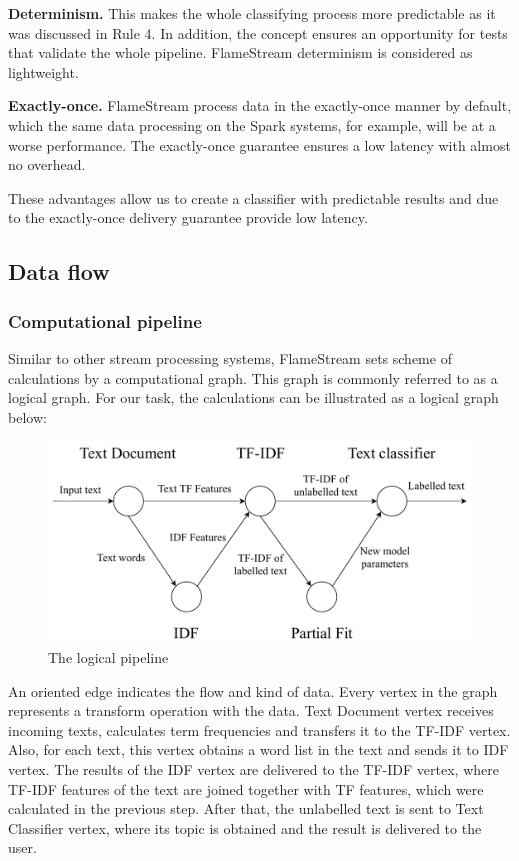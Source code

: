 \textbf{Determinism.} This makes the whole classifying process more predictable as it was discussed in \cite{stonebraker20058} Rule 4. In addition, the concept ensures an opportunity for tests that validate the whole pipeline. FlameStream determinism is considered as lightweight.

\textbf{Exactly-once.} FlameStream process data in the exactly-once manner by default, which the same data processing on the Spark systems, for example, will be at a worse performance. The exactly-once guarantee ensures a low latency with almost no overhead.

These advantages allow us to create a classifier with predictable results and due to the exactly-once delivery guarantee provide low latency.

\subsection{Data flow \label{DF}}

\subsubsection{Computational pipeline}

Similar to other stream processing systems, FlameStream sets scheme of calculations by a computational graph. This graph is commonly referred to as a logical graph. For our task, the calculations can be illustrated as a logical graph below:

\begin{figure}[htbp]
  \centering
  \includegraphics[scale=0.48]{pics/logical-graph}
  \caption{The logical pipeline}
  \label {logical graph}
\end{figure}

An oriented edge indicates the flow and kind of data. Every vertex in the graph represents a transform operation with the data. Text Document vertex receives incoming texts, calculates term frequencies and transfers it to the TF-IDF vertex. Also, for each text, this vertex obtains a word list in the text and sends it to IDF vertex. The results of the IDF vertex are delivered to the TF-IDF vertex, where TF-IDF features of the text are joined together with TF features, which were calculated in the previous step. After that, the unlabelled text is sent to Text Classifier vertex, where its topic is obtained and the result is delivered to the user.

